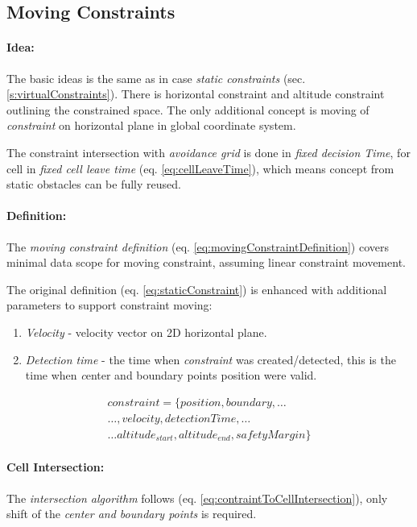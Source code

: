 \subsection{Moving Constraints}\label{s:MovingVirtualConstraints}
\paragraph{Idea:} The basic ideas is the same as in case \emph{static constraints} (sec. \ref{s:virtualConstraints}). There is horizontal constraint and altitude constraint outlining the constrained space. The only additional concept is moving of \emph{constraint} on horizontal plane in global coordinate system. 

The constraint intersection  with \emph{avoidance grid} is done in \emph{fixed decision Time}, for cell in \emph{fixed cell leave time} (eq. \ref{eq:cellLeaveTime}), which means concept from static obstacles can be fully reused.

\paragraph{Definition:} The \emph{moving constraint definition} (eq. \ref{eq:movingConstraintDefinition}) covers minimal data scope for  moving constraint, assuming linear constraint movement. 

The original definition (eq. \ref{eq:staticConstraint}) is enhanced with additional parameters to support constraint moving:

\begin{enumerate}
    \item \emph{Velocity} - velocity vector on 2D horizontal plane.
    
    \item \emph{Detection time} - the time when \emph{constraint} was created/detected, this is the time when \emph center and boundary points position were valid.
\end{enumerate}

\begin{multline}\label{eq:movingConstraintDefinition}
    constraint = \{position,boundary,\dots\\\dots, velocity, detection Time, \dots \\\dots altitude_{start},altitude_{end}, safety Margin\}
\end{multline}

\paragraph{Cell Intersection:} The \emph{intersection algorithm} follows (eq. \ref{eq:contraintToCellIntersection}), only shift of the \emph{center and boundary points} is required. 

